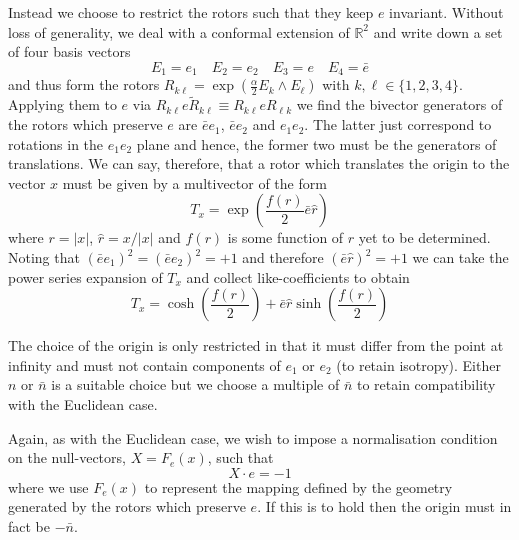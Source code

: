 Instead we choose to restrict the rotors such that they keep $e$
invariant. Without loss of generality, we deal with a conformal extension of
$\mathbb{R}^2$ and write down a set of four basis vectors
\begin{equation}
E_1 = e_1 \quad E_2 = e_2 \quad E_3 = e \quad E_4 = \bar{e}
\end{equation}
and thus form the rotors $R_{k\ell } = \exp\left(\frac{\alpha}{2}E_k \wedge E_\ell\right)$ with $k,\ell \in \{1,2,3,4\}$.
Applying them to $e$ via $R_{k\ell }e\tilde{R}_{k\ell } \equiv R_{k\ell }eR_{\ell k}$ we find
the bivector generators of the rotors which preserve $e$ are $\bar{e}e_1$, 
$\bar{e}e_2$ and $e_1e_2$. The latter just correspond to rotations in the
$e_1e_2$ plane and hence, the former two must be the generators of
translations. We can say, therefore, that a rotor which translates the origin to the vector
$x$ must be given by a multivector of the form
\begin{equation}
T_x = \exp\left(\frac{f(r)}{2}\bar{e}\hat{r}\right)
\end{equation}
where $r = |x|$, $\hat{r} = x/|x|$ and $f(r)$ is some function of $r$ yet to
be determined. Noting that $(\bar{e}{e_1})^2 = (\bar{e}e_2)^2 = +1$ and therefore
$(\bar{e}\hat{r})^2 = +1$ we can take the power series expansion of $T_x$ and
collect like-coefficients to obtain
\begin{equation}
T_x = \cosh\left(\frac{f(r)}{2}\right) + \bar{e}\hat{r}\sinh\left(\frac{f(r)}{2}\right)
\label{eqn:nonEuclidTrans1}
\end{equation}

The choice of the origin is only restricted in that it must differ from the 
point at infinity and must not contain components of $e_1$ or $e_2$ (to retain
isotropy). Either $n$ or $\bar{n}$ is a suitable choice but we choose
a multiple of $\bar{n}$
to retain compatibility with the Euclidean case.

Again, as with the Euclidean case, we wish to impose a normalisation condition 
on the null-vectors, 
$X = F_e(x)$, such that 
\begin{equation}
X \cdot e = -1
\end{equation}
where we use $F_e(x)$ to represent the mapping defined by the geometry
generated by the rotors which
preserve $e$. If this is to hold then the origin must in fact be $-\bar{n}$.

